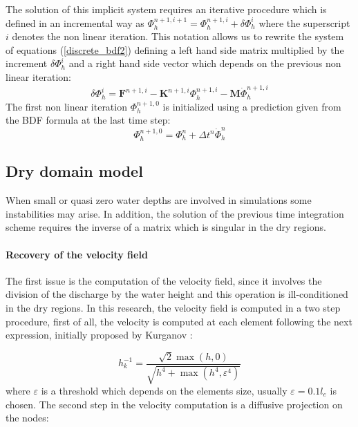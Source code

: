 \documentclass[a4paper,12pt]{article}
\begin{document}
The solution of this implicit system requires an iterative procedure which is defined in an incremental way as
$\Phi_h^{n+1,i+1} = \Phi_h^{n+1,i} + \delta\Phi_h^i$
where the superscript $i$ denotes the non linear iteration. This notation allows us to rewrite the system of equations (\ref{discrete_bdf2}) defining a left hand side matrix multiplied by the increment $\delta\Phi_h^i$ and a right hand side vector which depends on the previous non linear iteration:
\begin{equation}
[\beta_0\mathbf{M} + \mathbf{K}^{n+1}] \delta\Phi_h^i
= \mathbf{F}^{n+1,i} - \mathbf{K}^{n+1,i}\Phi_h^{n+1,i} - \mathbf{M}\dot{\Phi}_h^{n+1,i}
\end{equation}
The first non linear iteration $\Phi_h^{n+1,0}$ is initialized using a prediction given from the BDF formula at the last time step:
\begin{equation}
\Phi_h^{n+1,0} = \Phi_h^n + \Delta t^n \dot{\Phi}_h^{n}
\end{equation}



\subsection{Dry domain model}

When small or quasi zero water depths are involved in simulations some instabilities may arise. In addition, the solution of the previous time integration scheme requires the inverse of a matrix which is singular in the dry regions. 

\paragraph{Recovery of the velocity field}
The first issue is the computation of the velocity field, since it involves the division of the discharge by the water height and this operation is ill-conditioned in the dry regions. In this research, the velocity field is computed in a two step procedure, first of all, the velocity is computed at each element following the next expression, initially proposed by Kurganov \cite{kurganov2007}:

\begin{equation} \label{h_inv_kurganov}
h^{-1}_k = \frac{\sqrt{2}\max(h,0)}{\sqrt{h^4 + \max(h^4, \varepsilon^4)}}
\end{equation}
where $\varepsilon$ is a threshold which depends on the elements size, usually $\varepsilon = 0.1 l_e$ is chosen. The second step in the velocity computation is a diffusive projection on the nodes:
\end{document}
